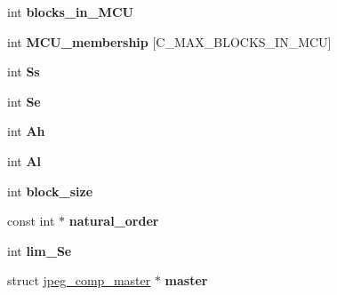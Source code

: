\begin{DoxyCompactItemize}
\item 
\hypertarget{structjpeg__compress__struct_ac32cf016a916984f68f158e5310a16bb}{int {\bfseries blocks\-\_\-in\-\_\-\-M\-C\-U}}\label{structjpeg__compress__struct_ac32cf016a916984f68f158e5310a16bb}

\item 
\hypertarget{structjpeg__compress__struct_a82b407a757dce1422123269d74965ef2}{int {\bfseries M\-C\-U\-\_\-membership} \mbox{[}C\-\_\-\-M\-A\-X\-\_\-\-B\-L\-O\-C\-K\-S\-\_\-\-I\-N\-\_\-\-M\-C\-U\mbox{]}}\label{structjpeg__compress__struct_a82b407a757dce1422123269d74965ef2}

\item 
\hypertarget{structjpeg__compress__struct_adda4b7ef0dda94b38b6e34df42769d81}{int {\bfseries Ss}}\label{structjpeg__compress__struct_adda4b7ef0dda94b38b6e34df42769d81}

\item 
\hypertarget{structjpeg__compress__struct_af2c1fe7c62791cda75219c10d71132d9}{int {\bfseries Se}}\label{structjpeg__compress__struct_af2c1fe7c62791cda75219c10d71132d9}

\item 
\hypertarget{structjpeg__compress__struct_a301a95efc904d22aca78592f7a21673a}{int {\bfseries Ah}}\label{structjpeg__compress__struct_a301a95efc904d22aca78592f7a21673a}

\item 
\hypertarget{structjpeg__compress__struct_a4160152697f6042b8fe1d6838a8118e2}{int {\bfseries Al}}\label{structjpeg__compress__struct_a4160152697f6042b8fe1d6838a8118e2}

\item 
\hypertarget{structjpeg__compress__struct_aad43e172d1ec5dd1e369b72ed8753410}{int {\bfseries block\-\_\-size}}\label{structjpeg__compress__struct_aad43e172d1ec5dd1e369b72ed8753410}

\item 
\hypertarget{structjpeg__compress__struct_a5143a0cb87983ebf1dfed8eae1cfeb17}{const int $\ast$ {\bfseries natural\-\_\-order}}\label{structjpeg__compress__struct_a5143a0cb87983ebf1dfed8eae1cfeb17}

\item 
\hypertarget{structjpeg__compress__struct_acb8a6365a8225a8d14d88b5d3c1d03c3}{int {\bfseries lim\-\_\-\-Se}}\label{structjpeg__compress__struct_acb8a6365a8225a8d14d88b5d3c1d03c3}

\item 
\hypertarget{structjpeg__compress__struct_a528221f0a048044b7272c9a41a32ab0a}{struct \hyperlink{structjpeg__comp__master}{jpeg\-\_\-comp\-\_\-master} $\ast$ {\bfseries master}}\label{structjpeg__compress__struct_a528221f0a048044b7272c9a41a32ab0a}


\end{DoxyCompactItemize}
